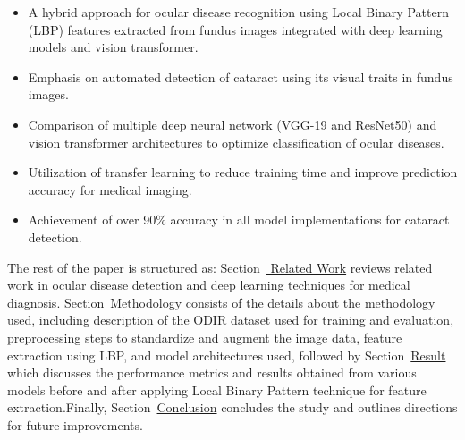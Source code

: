 \documentclass{ijclclp}
\begin{document}
\begin{itemize}
    \item A hybrid  approach for ocular disease recognition using Local Binary Pattern (LBP) features extracted from fundus images integrated with deep learning models and vision transformer.
    
    \item Emphasis on automated detection of cataract using its visual traits in fundus images.
    
    \item Comparison of multiple deep neural network (VGG-19 and ResNet50) and vision transformer architectures to optimize classification of ocular diseases.
    
    \item Utilization of transfer learning to reduce training time and improve prediction accuracy for medical imaging.
    
    \item Achievement of over 90\% accuracy in all model implementations for cataract detection.
  \end{itemize}
\vspace{0.5 em}
The rest of the paper is structured as: Section~\hyperref[sec:relwork]{ Related Work} reviews related work in ocular disease detection and deep learning techniques for medical diagnosis. Section~\hyperref[sec:method]{Methodology} consists of the details about the methodology used, including description of the ODIR dataset used for training and evaluation, preprocessing steps to standardize and augment the image data, feature extraction using LBP, and model architectures used, followed by Section~\hyperref[sec:result]{Result} which discusses the performance metrics and results obtained from various models before and after applying Local Binary Pattern technique for feature extraction.Finally, Section~\hyperref[sec:con]{Conclusion} concludes the study and outlines directions for future improvements.
\end{document}
